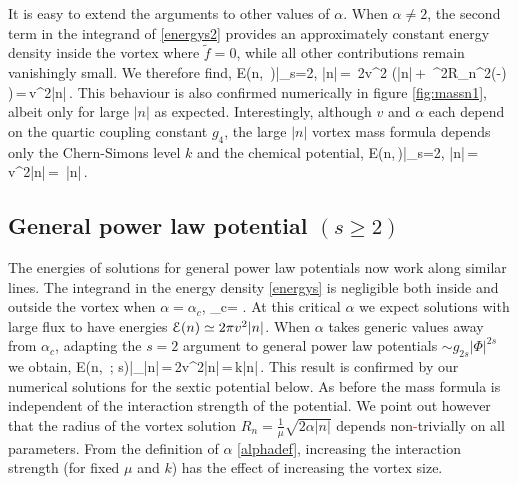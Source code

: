 It is easy to extend the arguments to  other values of $\alpha$. When $\alpha\neq 2$, the second term in the integrand of \eqref{energys2} provides an approximately constant energy density inside the vortex where $\tilde f=0$, while all other contributions remain vanishingly small. We therefore find,
\be
{\cal E}(n, \,\alpha)\big|_{s=2, |n|}\,=\, 2\pi v^2 \left(|n|\,+\, \mu^2R_n^2\left(-\right) \right)\,=\,\alpha\pi v^2|n|\,.
\ee
This behaviour is also confirmed numerically in figure \ref{fig:massn1}, albeit only for large $|n|$ as expected. Interestingly, although $v$ and $\alpha$ each  depend on the quartic coupling constant $g_4$, the large $|n|$ vortex mass formula depends only the Chern-Simons level $k$ and the chemical potential,
\be
{\cal E}(n,\,\alpha)\big|_{s=2, |n|}\,=\,\alpha\pi v^2|n|\,=\, |n|\,.
\ee

\subsection{General power law potential $(s\geq 2)$}
 The energies of solutions for general power law potentials now work along similar lines.  The integrand in the energy density \eqref{energys} is negligible both inside and outside the vortex when $\alpha=\alpha_c$,
 \be
 \alpha_c= .
 \ee 
 At this critical  $\alpha$ we expect solutions with large flux to have energies ${\cal E}(n)\simeq 2\pi v^2 |n|$. When $\alpha$ takes generic values away from  $\alpha_c$, adapting the $s=2$ argument to general power law potentials $\sim g_{2s}|\Phi|^{2s}$  we obtain,
 \be
 {\cal E}(n, \,\alpha; s)\big|_{|n|}\,=\,2\alpha\pi v^2|n|\,=\,k\mu|n|\,.\label{generalenergy}
 \ee
This result is confirmed by our numerical solutions for the sextic potential below. As before the mass formula is independent of the interaction strength of the potential. We point out however that the radius of the vortex solution $R_n=\frac{1}{\mu}\sqrt{2\alpha |n|}$ depends non\textcolor{red}{-}trivially on all parameters. From the definition of $\alpha$ \eqref{alphadef}, increasing the interaction strength (for fixed $\mu$ and $k$) has the effect of increasing the vortex size.
